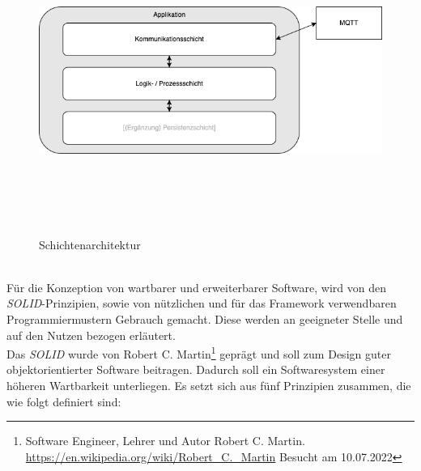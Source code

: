     \begin{figure}[hbt!]
        \centering
        \includegraphics[width=14cm,height=10cm,keepaspectratio]{images/Schichtenarchitektur.png}
        \caption{Schichtenarchitektur}
        \label{fig:schichtenarchitektur}
    \end{figure}
    \\
    Für die Konzeption von wartbarer und erweiterbarer Software, wird von den \textit{SOLID}-Prinzipien, sowie von nützlichen 
    und für das Framework verwendbaren Programmiermustern Gebrauch gemacht. Diese werden an geeigneter Stelle und auf den Nutzen bezogen erläutert.
    \\
    \linebreak
    Das \textit{SOLID} wurde von Robert C. Martin\footnote{Software Engineer, Lehrer und Autor Robert C. Martin. \url{https://en.wikipedia.org/wiki/Robert_C._Martin} Besucht am 10.07.2022} 
    geprägt und soll zum Design guter objektorientierter Software beitragen. Dadurch soll 
    ein Softwaresystem einer höheren Wartbarkeit unterliegen. Es setzt sich aus fünf Prinzipien zusammen, %
    die wie folgt definiert sind:

